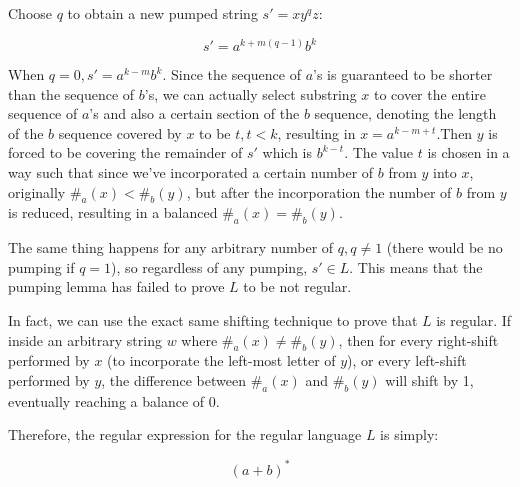 \documentclass{article}
\begin{document}
Choose $q$ to obtain a new pumped string $s' = xy^qz$:

$$s' = a^{k+m(q-1)} b^k$$

When $q=0, s' = a^{k-m}b^k$. Since the sequence of $a$'s is guaranteed to be shorter than the sequence of $b$'s, we can actually select substring $x$ to cover the entire sequence of $a$'s and also a certain section of the $b$ sequence, denoting the length of the $b$ sequence covered by $x$ to be $t, t < k$, resulting in $x = a^{k-m+t}$.Then $y$ is forced to be covering the remainder of $s'$ which is $b^{k-t}$. The value $t$ is chosen in a way such that since we've incorporated a certain number of $b$ from $y$ into $x$, originally $\#_a(x) < \#_b(y)$, but after the incorporation the number of $b$ from $y$ is reduced, resulting in a balanced $\#_a(x) = \#_b(y)$.

The same thing happens for any arbitrary number of $q, q \not = 1$ (there would be no pumping if $q=1$), so regardless of any pumping, $s' \in L$. This means that the pumping lemma has failed to prove $L$ to be not regular. 

In fact, we can use the exact same shifting technique to prove that $L$ is regular. If inside an arbitrary string $w$ where $\#_a(x) \not = \#_b(y)$, then for every right-shift performed by $x$ (to incorporate the left-most letter of $y$), or every left-shift performed by $y$, the difference between $\#_a(x)$ and $\#_b(y)$ will shift by 1, eventually reaching a balance of 0.

Therefore, the regular expression for the regular language $L$ is simply:

$$(a+b)^*$$
\end{document}
